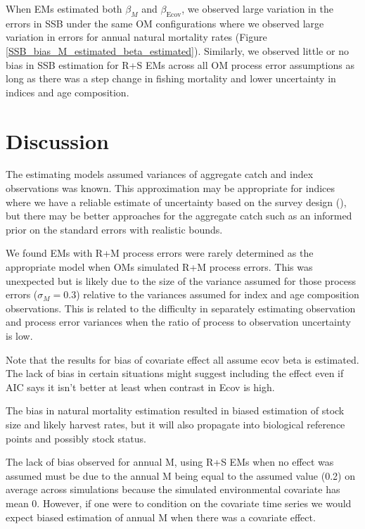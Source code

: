 \documentclass[
  12pt,
]{article}
\begin{document}
When EMs estimated both \(\beta_M\) and \(\beta_\text{Ecov}\), we
observed large variation in the errors in SSB under the same OM
configurations where we observed large variation in errors for annual
natural mortality rates (Figure
\ref{SSB_bias_M_estimated_beta_estimated}). Similarly, we observed
little or no bias in SSB estimation for R+S EMs across all OM process
error assumptions as long as there was a step change in fishing
mortality and lower uncertainty in indices and age composition.

\hypertarget{discussion}{%
\section*{Discussion}\label{discussion}}

The estimating models assumed variances of aggregate catch and index
observations was known. This approximation may be appropriate for
indices where we have a reliable estimate of uncertainty based on the
survey design (), but there may be better approaches for the aggregate
catch such as an informed prior on the standard errors with realistic
bounds.

We found EMs with R+M process errors were rarely determined as the
appropriate model when OMs simulated R+M process errors. This was
unexpected but is likely due to the size of the variance assumed for
those process errors (\(\sigma_M = 0.3\)) relative to the variances
assumed for index and age composition observations. This is related to
the difficulty in separately estimating observation and process error
variances when the ratio of process to observation uncertainty is low.

Note that the results for bias of covariate effect all assume ecov beta
is estimated. The lack of bias in certain situations might suggest
including the effect even if AIC says it isn't better at least when
contrast in Ecov is high.

The bias in natural mortality estimation resulted in biased estimation
of stock size and likely harvest rates, but it will also propagate into
biological reference points and possibly stock status.

The lack of bias observed for annual M, using R+S EMs when no effect was
assumed must be due to the annual M being equal to the assumed value
(0.2) on average across simulations because the simulated environmental
covariate has mean 0. However, if one were to condition on the covariate
time series we would expect biased estimation of annual M when there was
a covariate effect.
\end{document}
